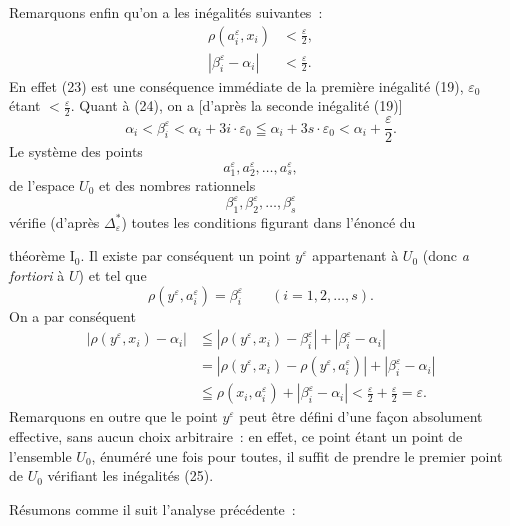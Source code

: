 \documentclass[a4paper,12pt]{amsart}
\newcommand{\srcpage}[1]{} %
\begin{document}
Remarquons enfin qu'on a les inégalités suivantes~:
\begin{align}
\rho(a_i^\varepsilon,x_i)&<\frac{\varepsilon}{2},\tag{23}\\
|\beta_i^\varepsilon-\alpha_i|&<\frac{\varepsilon}{2}.\tag{24}
\end{align}
En effet (23) est une conséquence immédiate de la première inégalité (19), $\varepsilon_0$ étant $<\frac{\varepsilon}{2}$. Quant à (24), on a [d'après la seconde inégalité (19)]
\[
\alpha_i<\beta_i^\varepsilon<\alpha_i+3i\cdot\varepsilon_0
\leqq\alpha_i+3s\cdot\varepsilon_0<\alpha_i+\frac{\varepsilon}{2}.
\]
Le système des points
\[
a_1^\varepsilon,a_2^\varepsilon,\dots,a_s^\varepsilon,
\]
de l'espace $U_0$ et des nombres rationnels
\[
\beta_1^\varepsilon,\beta_2^\varepsilon,\dots,\beta_s^\varepsilon
\]
vérifie (d'après $\Delta^*_\varepsilon$) toutes les conditions figurant dans l'énoncé du
\srcpage{61}
théorème I$_0$. Il existe par conséquent un point $y^\varepsilon$ appartenant à $U_0$ (donc \textit{a fortiori} à $U$) et tel que
\begin{equation}\tag{25}
\rho(y^\varepsilon,a_i^\varepsilon)=\beta_i^\varepsilon\qquad(i=1,2,\dots,s).
\end{equation}
On a par conséquent
\[
\begin{aligned}
|\rho(y^\varepsilon,x_i)-\alpha_i|
&\leqq|\rho(y^\varepsilon,x_i)-\beta_i^\varepsilon|+|\beta_i^\varepsilon-\alpha_i|\\
&=|\rho(y^\varepsilon,x_i)-\rho(y^\varepsilon,a_i^\varepsilon)|+|\beta_i^\varepsilon-\alpha_i|\\
&\leqq\rho(x_i,a_i^\varepsilon)+|\beta_i^\varepsilon-\alpha_i|
<\frac{\varepsilon}{2}+\frac{\varepsilon}{2}=\varepsilon.
\end{aligned}
\]
Remarquons en outre que le point $y^\varepsilon$ peut être défini d'une façon absolument effective, sans aucun choix arbitraire~: en effet, ce point étant un point de l'ensemble $U_0$, énuméré une fois pour toutes, il suffit de prendre le premier point de $U_0$ vérifiant les inégalités (25).

Résumons comme il suit l'analyse précédente~:
\end{document}

